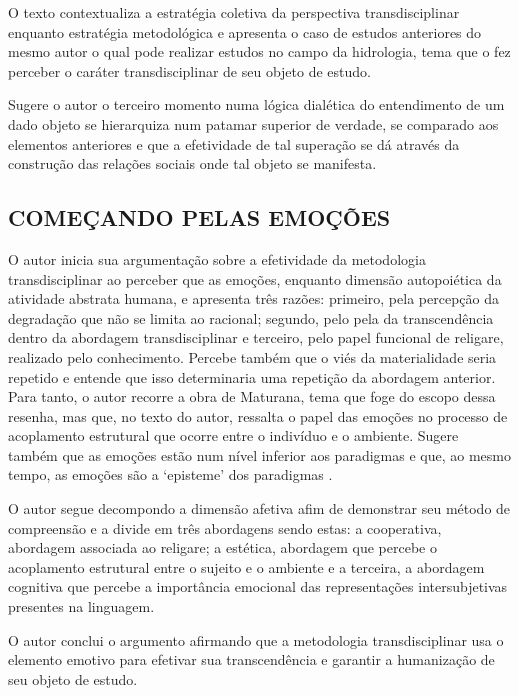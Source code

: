 \documentclass[
   article,       %
   12pt,          %
   oneside,       %
   a4paper,       %
   english,       %
   brazil,           %
   sumario=tradicional
   ]{abntex2}
\begin{document}
O texto contextualiza a estratégia coletiva da perspectiva transdisciplinar enquanto estratégia metodológica e apresenta o caso de estudos anteriores do mesmo autor o qual pode realizar estudos no campo da hidrologia, tema que o fez perceber o caráter transdisciplinar de seu objeto de estudo.

Sugere o autor o terceiro momento numa lógica dialética do entendimento de um dado objeto se hierarquiza num patamar superior de verdade, se comparado aos elementos anteriores e que a efetividade de tal superação se dá através da construção das relações sociais onde tal objeto se manifesta.



\subsection{COMEÇANDO PELAS EMOÇÕES}

O autor inicia sua argumentação sobre a efetividade da metodologia transdisciplinar ao perceber que as emoções, enquanto dimensão autopoiética da atividade abstrata humana, e apresenta três razões: primeiro, pela percepção da degradação que não se limita ao racional; segundo, pelo pela da transcendência dentro da abordagem transdisciplinar e terceiro, pelo papel funcional de religare, realizado pelo conhecimento. Percebe também que o viés da materialidade seria repetido e entende que isso determinaria uma repetição da abordagem anterior. Para tanto, o autor recorre a obra de Maturana, tema que foge do escopo dessa resenha, mas que, no texto do autor, ressalta o papel das emoções no processo de acoplamento estrutural que ocorre entre o indivíduo e o ambiente.
Sugere também que as emoções estão num nível inferior aos paradigmas e que, ao mesmo tempo, as emoções são a ‘episteme’ dos paradigmas \cite[p. 86]{Paradigma_Transdisciplinar_Metodologica}.

O autor segue decompondo a dimensão afetiva afim de demonstrar seu método de compreensão e a divide em três abordagens sendo estas:  a cooperativa, abordagem associada ao religare; a estética, abordagem que percebe o acoplamento estrutural entre o sujeito e o ambiente e a terceira, a abordagem cognitiva que percebe a importância emocional das representações intersubjetivas presentes na linguagem.

O autor conclui o argumento afirmando que a metodologia transdisciplinar usa o elemento emotivo para efetivar sua transcendência e garantir a humanização de seu objeto de estudo.
\end{document}
